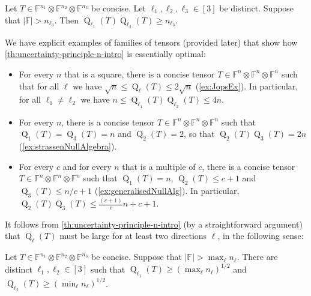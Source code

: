 \documentclass{daj}
\DeclareMathOperator{\subrank}{Q}
\newcommand{\FF}{\mathbb{F}}
\begin{document}
\begin{theorem}\label{th:uncertainty-principle-n-intro}
    Let $T \in \FF^{n_1} \otimes \FF^{n_2} \otimes \FF^{n_3}$ be concise. Let $\ell_1, \ell_2, \ell_3 \in [3]$ be distinct. Suppose that $|\FF|>n_{\ell_3}$. Then
    $\subrank_{\ell_1}(T)\subrank_{\ell_2}(T) \geq n_{\ell_3}.$
\end{theorem}

We have explicit examples of families of tensors (provided later) that show how \autoref{th:uncertainty-principle-n-intro} is essentially optimal:
\begin{itemize}
\item For every $n$ that is a square, 
there is a concise tensor $T \in \FF^{n} \otimes \FF^n \otimes \FF^n$ such that for all $\ell$ we have
$\sqrt{n} \leq \subrank_\ell(T)\leq 2\sqrt{n}$ (\autoref{ex:JopsEx}). In particular, for all $\ell_1 \neq \ell_2$ we have $n\leq\subrank_{\ell_1}(T)\subrank_{\ell_2}(T)\leq4n$. 

\item For every $n$, there is a concise tensor $T \in \FF^n \otimes \FF^n \otimes \FF^n$ such that $\subrank_1(T) = \subrank_3(T) = n$ and $\subrank_2(T) = 2$, so that $\subrank_2(T) \subrank_3(T) = 2n$ (\autoref{ex:strassenNullAlgebra}).

\item For every $c$ and for every $n$  that is a multiple of $c$,
%
there is a concise tensor $T \in \FF^{n} \otimes \FF^n \otimes \FF^n$ such that
%
$\subrank_1(T)=n$, $\subrank_2(T)\leq c+1$ and $\subrank_3(T)\leq n/c+1$ (\autoref{ex:generalisedNullAlg}).
In particular,
$\subrank_2(T)\subrank_3(T)\leq  \tfrac{(c+1)}{c} n+c+1$.
\end{itemize}

It follows from \autoref{th:uncertainty-principle-n-intro} (by a straightforward argument) that $\subrank_\ell(T)$ must be large for at least two directions $\ell$, in the following sense:
\begin{corollary}
    \label{th:rank-two-direc-intro}
    Let $T \in \FF^{n_1} \otimes \FF^{n_2} \otimes \FF^{n_3}$ be concise.
    Suppose that $|\FF|>\max_\ell n_\ell$.
    There are distinct $\ell_1, \ell_2 \in [3]$ such that $\subrank_{\ell_1}(T) \geq (\max_\ell n_\ell)^{1/2}$ and $\subrank_{\ell_2}(T) \geq (\min_\ell n_\ell)^{1/2}$.
\end{corollary}
\end{document}

